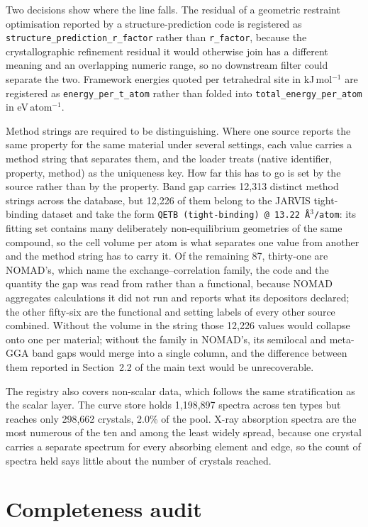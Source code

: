 Two decisions show where the line falls. The residual of a geometric restraint
optimisation reported by a structure-prediction code is registered as
\texttt{structure\_prediction\_r\_factor} rather than \texttt{r\_factor}, because
the crystallographic refinement residual it would otherwise join has a different
meaning and an overlapping numeric range, so no downstream filter could separate
the two. Framework energies quoted per tetrahedral site in kJ\,mol$^{-1}$ are
registered as \texttt{energy\_per\_t\_atom} rather than folded into
\texttt{total\_energy\_per\_atom} in eV\,atom$^{-1}$.

Method strings are required to be distinguishing. Where one source reports the
same property for the same material under several settings, each value carries a
method string that separates them, and the loader treats (native identifier,
property, method) as the uniqueness key. How far this has to go is set by the
source rather than by the property. Band gap carries 12{,}313 distinct method
strings across the database, but 12{,}226 of them belong to the JARVIS tight-binding
dataset and take the form \texttt{QETB (tight-binding) @ 13.22 \AA$^{3}$/atom}:
its fitting set contains many deliberately non-equilibrium geometries of the same
compound, so the cell volume per atom is what separates one value from another
and the method string has to carry it. Of the remaining 87, thirty-one are
NOMAD's, which name the exchange--correlation family, the code and the quantity
the gap was read from rather than a functional, because NOMAD aggregates
calculations it did not run and reports what its depositors declared; the other
fifty-six are the functional and setting labels of every other source combined.
Without the volume in the string those 12{,}226 values would collapse onto one
per material; without the family in NOMAD's, its semilocal and meta-GGA band gaps
would merge into a single column, and the difference between them reported in
Section~2.2 of the main text would be unrecoverable.

The registry also covers non-scalar data, which follows the same stratification
as the scalar layer. The curve store holds 1{,}198{,}897 spectra across ten types
but reaches only 298{,}662 crystals, 2.0\% of the pool. X-ray absorption spectra
are the most numerous of the ten and among the least widely spread, because one
crystal carries a separate spectrum for every absorbing element and edge, so the
count of spectra held says little about the number of crystals reached.

\section{Completeness audit}\label{note:audit}

